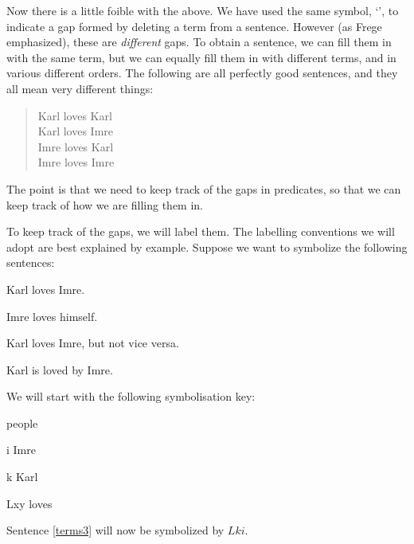 Now there is a little foible with the above. We have used the same symbol, `\blank', to indicate a gap formed by deleting a term from a sentence. However (as Frege emphasized), these are \emph{different} gaps. To obtain a sentence, we can fill them in with the same term, but we can equally fill them in with different terms, and in various different orders. The following are all perfectly good sentences, and they all mean very different things:
	\begin{quote}
		Karl loves Karl\\
		Karl loves Imre\\
		Imre loves Karl\\
		Imre loves Imre
	\end{quote}
The point is that we need to keep track of the gaps in predicates, so that we can keep track of how we are filling them in.

To keep track of the gaps, we will label them. The labelling conventions we will adopt are best explained by example. Suppose we want to symbolize the following sentences:
	\begin{earg}
		\item[\ex{terms3}] Karl loves Imre.
		\item[\ex{terms4}] Imre loves himself.
		\item[\ex{terms5}] Karl loves Imre, but not vice versa.
		\item[\ex{terms6}] Karl is loved by Imre.
	\end{earg}
We will start with the following symbolisation key:
	\begin{ekey}
		\item[\text{domain}] people
		\item[i] Imre
		\item[k] Karl
		\item[Lxy]  loves 
	\end{ekey}
Sentence \ref{terms3} will now be symbolized by $Lki$.

